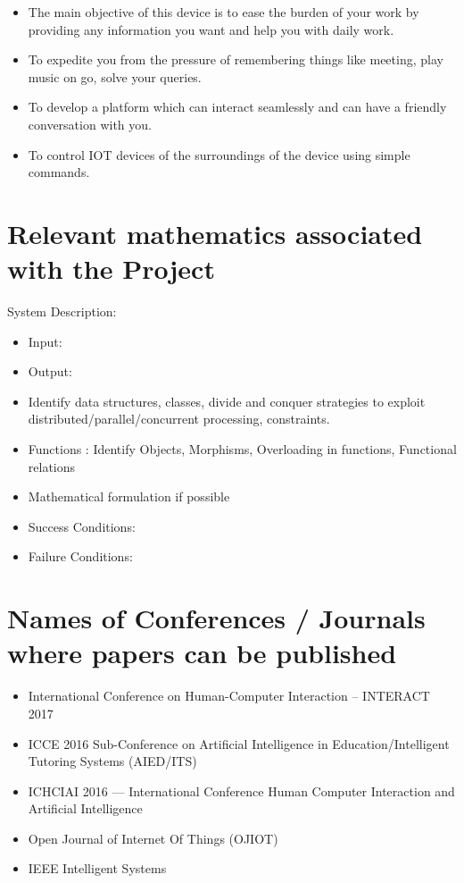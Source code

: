 \documentclass[16pt,oneside,a4paper]{article}
\begin{document}
\begin{itemize}
	\item The main objective of this device is to ease the burden of your work by providing any information you want and help you with daily work.
	\item To expedite you from the pressure of remembering things like meeting, play music on go, solve your queries.
	\item To develop a platform which can interact seamlessly and can have a friendly conversation with you.
	\item To control IOT devices of the surroundings of the device using simple commands.
\end{itemize}

	
\section{Relevant mathematics associated with the Project}
\label{sec:math}
System Description:
\begin{itemize} 
\item Input:	 
\item Output:	 
\item Identify data structures, classes, divide and conquer strategies to exploit distributed/parallel/concurrent processing, constraints. 
\item Functions : Identify Objects, Morphisms, Overloading in functions, Functional relations
\item Mathematical formulation if possible
\item Success Conditions:	 
\item Failure Conditions:		
\end{itemize}


\section{Names of Conferences / Journals where papers can be published}
\begin{itemize}
\item  International Conference on Human-Computer Interaction – INTERACT 2017 
\item  ICCE 2016 Sub-Conference on Artificial Intelligence in Education/Intelligent Tutoring Systems (AIED/ITS)
\item  ICHCIAI 2016 — International Conference Human Computer Interaction and Artificial Intelligence 
\item  Open Journal of Internet Of Things (OJIOT) 
\item  IEEE Intelligent Systems
\end{itemize}
\end{document}
